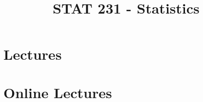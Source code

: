 
\title{STAT 231 - Statistics}


\maketitle

\tableofcontents

\newpage

\chapter{Lectures}










\chapter{Online Lectures}















